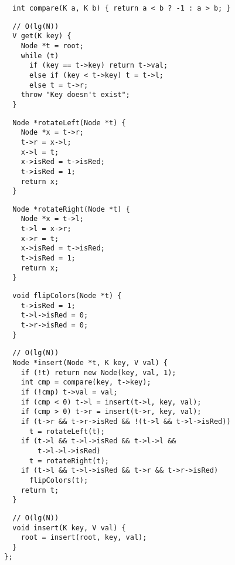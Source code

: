 \documentclass[twoside]{article}
\begin{document}
\begin{multicols*}{2}
\begin{verbatim}
  int compare(K a, K b) { return a < b ? -1 : a > b; }
\end{verbatim}
\vspace{-12pt}
\begin{verbatim}
  // O(lg(N))
  V get(K key) {
    Node *t = root;
    while (t)
      if (key == t->key) return t->val;
      else if (key < t->key) t = t->l;
      else t = t->r;
    throw "Key doesn't exist";
  }
\end{verbatim}
\vspace{-12pt}
\begin{verbatim}
  Node *rotateLeft(Node *t) {
    Node *x = t->r;
    t->r = x->l;
    x->l = t;
    x->isRed = t->isRed;
    t->isRed = 1;
    return x;
  }
\end{verbatim}
\vspace{-12pt}
\begin{verbatim}
  Node *rotateRight(Node *t) {
    Node *x = t->l;
    t->l = x->r;
    x->r = t;
    x->isRed = t->isRed;
    t->isRed = 1;
    return x;
  }
\end{verbatim}
\vspace{-12pt}
\begin{verbatim}
  void flipColors(Node *t) {
    t->isRed = 1;
    t->l->isRed = 0;
    t->r->isRed = 0;
  }
\end{verbatim}
\vspace{-12pt}
\begin{verbatim}
  // O(lg(N))
  Node *insert(Node *t, K key, V val) {
    if (!t) return new Node(key, val, 1);
    int cmp = compare(key, t->key);
    if (!cmp) t->val = val;
    if (cmp < 0) t->l = insert(t->l, key, val);
    if (cmp > 0) t->r = insert(t->r, key, val);
    if (t->r && t->r->isRed && !(t->l && t->l->isRed))
      t = rotateLeft(t);
    if (t->l && t->l->isRed && t->l->l &&
        t->l->l->isRed)
      t = rotateRight(t);
    if (t->l && t->l->isRed && t->r && t->r->isRed)
      flipColors(t);
    return t;
  }
\end{verbatim}
\vspace{-12pt}
\begin{verbatim}
  // O(lg(N))
  void insert(K key, V val) {
    root = insert(root, key, val);
  }
};
\end{verbatim}

\subsectionfont{\large\bfseries\sffamily\underline}

\end{multicols*}
\end{document}
